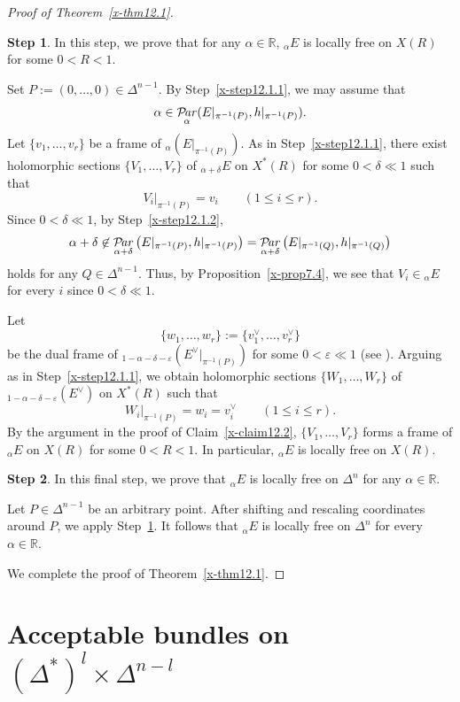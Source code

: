 \documentclass[12pt,twoside]{amsart}
\DeclareMathOperator{\Par}{\mathcal{P}\!\it{ar}}
\theoremstyle{definition}
\newtheorem{step}{Step}
\begin{document}
\begin{proof}[Proof of Theorem~\ref{x-thm12.1}]
\begin{step}\label{x-step12.1.3}
In this step, we prove that for any $\alpha\in \mathbb R$,
${}_\alpha E$ is locally free on $X(R)$ for some $0<R<1$.

Set $P:=(0,\ldots,0)\in \Delta^{n-1}$.
By Step~\ref{x-step12.1.1}, we may assume that
\[
\alpha \in
\Par_\alpha(E|_{\pi^{-1}(P)},h|_{\pi^{-1}(P)}).
\]
Let $\{v_1,\ldots,v_r\}$ be a frame of
${}_\alpha(E|_{\pi^{-1}(P)})$.
As in Step~\ref{x-step12.1.1}, there exist holomorphic sections
$\{V_1,\ldots,V_r\}$ of ${}_{\alpha+\delta}E$ on $X^*(R)$ for some
$0<\delta\ll1$ such that
\[
V_i|_{\pi^{-1}(P)}=v_i \qquad (1\le i\le r).
\]
Since $0<\delta\ll 1$, by Step~\ref{x-step12.1.2}, 
\[
\alpha+\delta\not\in \Par_{\alpha+\delta}\left(E|_{\pi^{-1}(P)}, 
h|_{\pi^{-1}(P)}\right)=\Par_{\alpha+\delta}\left(E|_{\pi^{-1}(Q)}, 
h|_{\pi^{-1}(Q)}\right)
\] 
holds for any $Q\in \Delta^{n-1}$. 
Thus, by Proposition~\ref{x-prop7.4}, we see that
$V_i\in {}_\alpha E$ for every $i$ since 
$0<\delta\ll 1$.

Let
\[
\{w_1,\ldots,w_r\}:=\{v_1^\vee,\ldots,v_r^\vee\}
\]
be the dual frame of
${}_{1-\alpha-\delta-\varepsilon}(E^\vee|_{\pi^{-1}(P)})$ for some
$0<\varepsilon\ll1$ (see \cite[Theorem~1.12]{fujino-fujisawa-ono}).
Arguing as in Step~\ref{x-step12.1.1}, we obtain holomorphic sections
$\{W_1,\ldots,W_r\}$ of ${}_{1-\alpha-\delta-\varepsilon}(E^\vee)$ on
$X^*(R)$ such that
\[
W_i|_{\pi^{-1}(P)}=w_i=v_i^\vee \qquad (1\le i\le r).
\]
By the argument in the proof of Claim~\ref{x-claim12.2},
$\{V_1,\ldots,V_r\}$ forms a frame of ${}_\alpha E$ on $X(R)$ for some
$0<R<1$.
In particular, ${}_\alpha E$ is locally free on $X(R)$.
\end{step}

\begin{step}\label{x-step12.1.4}
In this final step, we prove that ${}_\alpha E$ is locally free on
$\Delta^n$ for any $\alpha\in \mathbb R$.

Let $P\in \Delta^{n-1}$ be an arbitrary point.
After shifting and rescaling coordinates around $P$, we apply
Step~\ref{x-step12.1.3}.
It follows that ${}_\alpha E$ is locally free on $\Delta^n$ for every
$\alpha\in \mathbb R$.
\end{step}

We complete the proof of Theorem~\ref{x-thm12.1}.
\end{proof}

\section{Acceptable bundles on $(\Delta^*)^l\times \Delta^{n-l}$}
\label{x-sec13}
\end{document}
